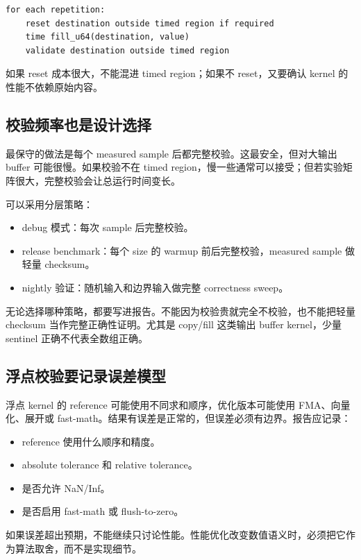 \begin{lstlisting}
for each repetition:
    reset destination outside timed region if required
    time fill_u64(destination, value)
    validate destination outside timed region
\end{lstlisting}

如果 reset 成本很大，不能混进 timed region；如果不 reset，又要确认 kernel 的性能不依赖原始内容。

\subsection{校验频率也是设计选择}

最保守的做法是每个 measured sample 后都完整校验。这最安全，但对大输出 buffer 可能很慢。如果校验不在 timed region，慢一些通常可以接受；但若实验矩阵很大，完整校验会让总运行时间变长。

可以采用分层策略：

\begin{itemize}
  \item debug 模式：每次 sample 后完整校验。
  \item release benchmark：每个 size 的 warmup 前后完整校验，measured sample 做轻量 checksum。
  \item nightly 验证：随机输入和边界输入做完整 correctness sweep。
\end{itemize}

无论选择哪种策略，都要写进报告。不能因为校验贵就完全不校验，也不能把轻量 checksum 当作完整正确性证明。尤其是 copy/fill 这类输出 buffer kernel，少量 sentinel 正确不代表全数组正确。

\subsection{浮点校验要记录误差模型}

浮点 kernel 的 reference 可能使用不同求和顺序，优化版本可能使用 FMA、向量化、展开或 fast-math。结果有误差是正常的，但误差必须有边界。报告应记录：

\begin{itemize}
  \item reference 使用什么顺序和精度。
  \item absolute tolerance 和 relative tolerance。
  \item 是否允许 NaN/Inf。
  \item 是否启用 fast-math 或 flush-to-zero。
\end{itemize}

如果误差超出预期，不能继续只讨论性能。性能优化改变数值语义时，必须把它作为算法取舍，而不是实现细节。


